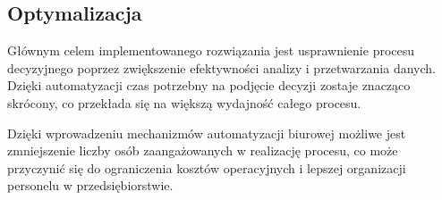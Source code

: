 \subsection{Optymalizacja}
Głównym celem implementowanego rozwiązania jest usprawnienie procesu decyzyjnego poprzez zwiększenie efektywności analizy i przetwarzania danych. Dzięki automatyzacji czas potrzebny na podjęcie decyzji zostaje znacząco skrócony, co przekłada się na większą wydajność całego procesu.

Dzięki wprowadzeniu mechanizmów automatyzacji biurowej możliwe jest zmniejszenie liczby osób zaangażowanych w realizację procesu, co może przyczynić się do ograniczenia kosztów operacyjnych i lepszej organizacji personelu w przedsiębiorstwie.

\begin{comment}
Priorytetem implementowanego rozwiązania jest usprawnienie całego procesu decyzyjnego. Głównym elementem jest redukcja czasu wymaganego na realizację poszczególnych zadań, co osiągnięto dzięki wprowadzeniu mechanizmów automatyzacji biurowej. Ważnym aspektem jest również poprawa efektywności analizy oraz przetwarzania danych przez użytkowników, umożliwiając podejmowanie bardziej trafnych decyzji w krótszym czasie.

Zmniejszenie liczby osób zaangażowanych w realizację procesu umożliwia optymalizację wykorzystania zasobów ludzkich. Dzięki temu możliwe jest ograniczenie kosztów operacyjnych i bardziej efektywne zarządzanie personelem, co przyczynia się do zwiększenia ogólnej wydajności przedsiębiorstwa.
\end{comment}